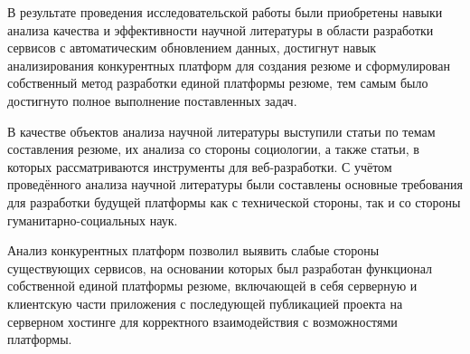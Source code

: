 \documentclass[master, och, coursework]{SCWorks}
\begin{document}
\newpage
\conclusion
В результате проведения исследовательской работы были приобретены навыки анализа 
качества и эффективности научной литературы в области разработки сервисов 
с автоматическим обновлением данных, достигнут навык анализирования конкурентных 
платформ для создания резюме и сформулирован собственный метод разработки 
единой платформы резюме, тем самым было достигнуто полное выполнение поставленных задач.

В качестве объектов анализа научной литературы выступили статьи по темам составления 
резюме, их анализа со стороны социологии, а также статьи, в которых рассматриваются 
инструменты для веб-разработки. С учётом проведённого анализа научной литературы 
были составлены основные требования для разработки будущей платформы как с технической 
стороны, так и со стороны гуманитарно-социальных наук.

Анализ конкурентных платформ позволил выявить слабые стороны существующих сервисов, 
на основании которых был разработан функционал собственной единой платформы 
резюме, включающей в себя серверную и клиентскую части приложения с последующей
публикацией проекта на серверном хостинге для корректного взаимодействия 
с возможностями платформы.



%






\appendix
\end{document}
